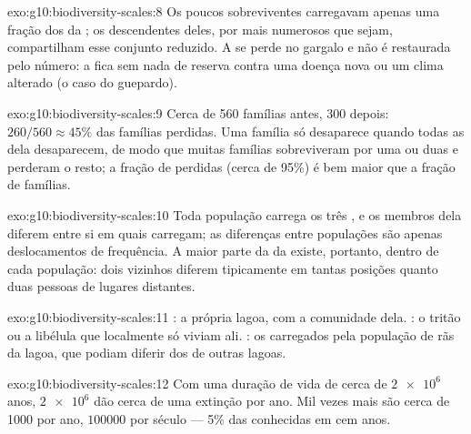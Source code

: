 \begin{solution}{exo:g10:biodiversity-scales:8}
Os poucos sobreviventes carregavam apenas uma fração dos  da
; os descendentes deles, por mais numerosos que sejam,
compartilham esse conjunto reduzido. A  se perde no
gargalo e não é restaurada pelo número: a  fica sem nada de
reserva contra uma doença nova ou um clima alterado (o caso do
guepardo).
\end{solution}

\begin{solution}{exo:g10:biodiversity-scales:9}
Cerca de 560 famílias antes, 300 depois: $260/560 \approx 45\%$ das
famílias perdidas. Uma família só desaparece quando todas as 
dela desaparecem, de modo que muitas famílias sobreviveram por uma ou
duas  e perderam o resto; a fração de  perdidas (cerca
de 95\%) é bem maior que a fração de famílias.
\end{solution}

\begin{solution}{exo:g10:biodiversity-scales:10}
Toda população carrega os três , e os membros dela diferem entre
si em quais carregam; as diferenças entre populações são apenas
deslocamentos de frequência. A maior parte da  da
 existe, portanto, dentro de cada população: dois vizinhos
diferem tipicamente em tantas posições quanto duas pessoas de lugares
distantes.
\end{solution}

\begin{solution}{exo:g10:biodiversity-scales:11}
: a própria lagoa, com a comunidade dela. : o tritão
ou a libélula que localmente só viviam ali. : os  carregados
pela população de rãs da lagoa, que podiam diferir dos de outras
lagoas.
\end{solution}

\begin{solution}{exo:g10:biodiversity-scales:12}
Com uma duração de vida de cerca de $\num{2e6}$ anos, $\num{2e6}$
 dão cerca de uma extinção por ano. Mil vezes mais são cerca de
1000  por ano, $\num{100000}$ por século --- 5\% das 
conhecidas em cem anos.
\end{solution}

